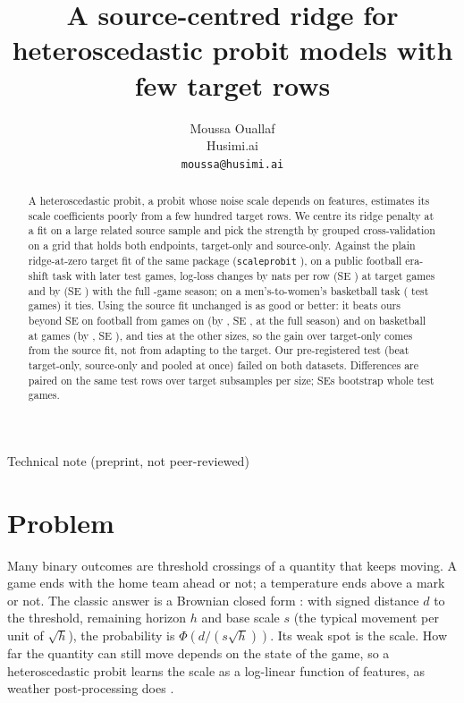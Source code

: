 \documentclass{article}
\title{A source-centred ridge for heteroscedastic probit models with few target rows}
\author{%
  Moussa Ouallaf \\
  Husimi.ai \\
  \texttt{moussa@husimi.ai} \\
}
\begin{document}
\maketitle
\vspace{-1.5em}
\begin{center}\small Technical note (preprint, not peer-reviewed)\end{center}
\vspace{0.5em}

\begin{abstract}
A heteroscedastic probit, a probit whose noise scale depends on features, estimates its scale coefficients poorly from a few hundred target rows.
We centre its ridge penalty at a fit on a large related source sample and pick the strength by grouped cross-validation on a grid that holds both endpoints, target-only and source-only.
Against the plain ridge-at-zero target fit of the same package (\texttt{scaleprobit} \nPkgVersion), on a public football era-shift task with \nFbTestGames{} later test games, log-loss changes by \nFbBDiffTO{} nats per row (SE \nFbBSeTO) at \nFbBGames{} target games and by \nFbFullDiffTO{} (SE \nFbFullSeTO) with the full \nFbFullGames-game season; on a men's-to-women's basketball task (\nHpTestGames{} test games) it ties.
Using the source fit unchanged is as good or better: it beats ours beyond SE on football from \nFbCGames{} games on (by \nFbFullDiffSO, SE \nFbFullSeSO, at the full season) and on basketball at \nHpAGames{} games (by \nHpADiffSO, SE \nHpASeSO), and ties at the other sizes, so the gain over target-only comes from the source fit, not from adapting to the target.
Our pre-registered test (beat target-only, source-only and pooled at once) failed on both datasets.
Differences are paired on the same test rows over \nSubsamples{} target subsamples per size; SEs bootstrap whole test games.
\end{abstract}

\section{Problem}
\label{sec:problem}

Many binary outcomes are threshold crossings of a quantity that keeps moving.
A game ends with the home team ahead or not; a temperature ends above a mark or not.
The classic answer is a Brownian closed form \citep{stern1994}: with signed distance $d$ to the threshold, remaining horizon $h$ and base scale $s$ (the typical movement per unit of $\sqrt{h}$), the probability is $\Phi(d / (s\sqrt{h}))$.
Its weak spot is the scale.
How far the quantity can still move depends on the state of the game, so a heteroscedastic probit \citep{harvey1976} learns the scale as a log-linear function of features, as weather post-processing does \citep{gneiting2005,messner2014}.
\end{document}
